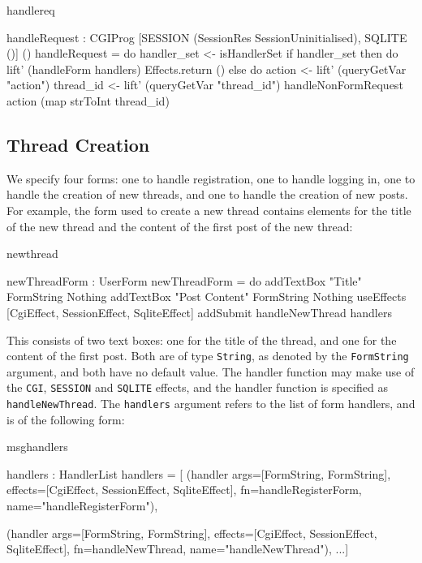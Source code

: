 \begin{SaveVerbatim}{handlereq}

handleRequest : CGIProg 
     [SESSION (SessionRes SessionUninitialised), 
      SQLITE ()] ()
handleRequest = do 
  handler_set <- isHandlerSet
  if handler_set then do
    lift' (handleForm handlers)
    Effects.return ()
  else do
    action <- lift' (queryGetVar "action")
    thread_id <- lift' (queryGetVar "thread_id")
    handleNonFormRequest action (map strToInt thread_id)

\end{SaveVerbatim}

\subsection{Thread Creation}
We specify four forms: one to handle registration, one to handle logging in,
one to handle the creation of new threads, and one to handle the creation of
new posts. For example, the form used to create a new thread
contains elements for the title of the new thread and the content of the
first post of the new thread:

\begin{SaveVerbatim}{newthread}

newThreadForm : UserForm
newThreadForm = do
  addTextBox "Title" FormString Nothing
  addTextBox "Post Content" FormString Nothing 
  useEffects [CgiEffect, SessionEffect, SqliteEffect]
  addSubmit handleNewThread handlers

\end{SaveVerbatim}

\noindent
This consists of two text boxes: one for the title of the thread, and one
for the content of the first post. Both are of type \texttt{String}, as denoted
by the \texttt{FormString} argument, and both have no default value. The
handler function may make use of the \texttt{CGI}, \texttt{SESSION} and
\texttt{SQLITE} effects, and the handler function is specified as
\texttt{handleNewThread}. The \texttt{handlers} argument refers to the list of
form handlers, and is of the following form:

\begin{SaveVerbatim}{msghandlers}

handlers : HandlerList
handlers = [
 (handler args=[FormString, FormString], 
          effects=[CgiEffect, SessionEffect, SqliteEffect], 
          fn=handleRegisterForm, 
          name="handleRegisterForm"),
  
 (handler args=[FormString, FormString], 
          effects=[CgiEffect, SessionEffect, SqliteEffect], 
          fn=handleNewThread, 
          name="handleNewThread"),
     ...]

\end{SaveVerbatim}
\noindent
{}

